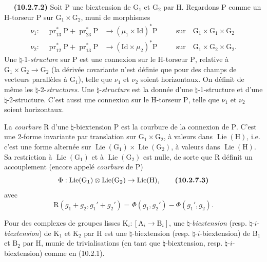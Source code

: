 \documentclass[11pt,leqno]{article}
\newcommand{\Page}[1]{\ifvmode\noindent\else\unskip\ \fi{\footnotesize\textcolor{gray}{[p.\,#1]}}\ \ignorespaces}
\begin{document}
\Page{65}
\textbf{(10.2.7.2)} Soit \(\mathrm{P}\) une biextension de
\(\mathrm{G}_1\) et \(\mathrm{G}_2\) par \(\mathrm{H}\).
Regardons \(\mathrm{P}\) comme un \(\mathrm{H}\)-torseur
\(\mathrm{P}\) sur \(\mathrm{G}_1\times\mathrm{G}_2\), muni de
morphismes
\[
\begin{aligned}
\nu_1:\quad
\operatorname{pr}_{13}^{*}\mathrm{P}
+\operatorname{pr}_{23}^{*}\mathrm{P}
&\to(\mu_1\times\mathrm{Id})^{*}\mathrm{P}
&&\quad\text{sur}\quad
\mathrm{G}_1\times\mathrm{G}_1\times\mathrm{G}_2\\
\nu_2:\quad
\operatorname{pr}_{12}^{*}\mathrm{P}
+\operatorname{pr}_{13}^{*}\mathrm{P}
&\to(\mathrm{Id}\times\mu_2)^{*}\mathrm{P}
&&\quad\text{sur}\quad
\mathrm{G}_1\times\mathrm{G}_2\times\mathrm{G}_2.
\end{aligned}
\]
Une \(\natural\)-1-\textit{structure} sur \(\mathrm{P}\) est une
connexion sur le \(\mathrm{H}\)-torseur \(\mathrm{P}\), relative à
\(\mathrm{G}_1\times\mathrm{G}_2\to\mathrm{G}_2\) (la dérivée
covariante n’est définie que pour des champs de vecteurs parallèles
à \(\mathrm{G}_1\)), telle que \(\nu_1\) et \(\nu_2\) soient
horizontaux. On définit de même les
\(\natural\)-2-\textit{structures}. Une
\(\natural\)-\textit{structure} est la donnée d’une
\(\natural\)-1-structure et d’une \(\natural\)-2-structure.
C’est aussi une connexion sur le \(\mathrm{H}\)-torseur
\(\mathrm{P}\), telle que \(\nu_1\) et \(\nu_2\) soient horizontaux.

La \textit{courbure} \(\mathrm{R}\) d’une \(\natural\)-biextension
\(\mathrm{P}\) est la courbure de la connexion de \(\mathrm{P}\).
C’est une 2-forme invariante par translation sur
\(\mathrm{G}_1\times\mathrm{G}_2\), à valeurs dans
\(\operatorname{Lie}(\mathrm{H})\), i.e. c’est une forme alternée
sur
\(\operatorname{Lie}(\mathrm{G}_1)\times
\operatorname{Lie}(\mathrm{G}_2)\), à valeurs dans
\(\operatorname{Lie}(\mathrm{H})\).
Sa restriction à \(\operatorname{Lie}(\mathrm{G}_1)\) et à
\(\operatorname{Lie}(\mathrm{G}_2)\) est nulle, de sorte que
\(\mathrm{R}\) définit un accouplement (encore appelé
\textit{courbure} de \(\mathrm{P}\))
\[
\Phi:\operatorname{Lie}(\mathrm{G}_1)\otimes
\operatorname{Lie}(\mathrm{G}_2)\to\operatorname{Lie}(\mathrm{H}),
\tag*{\textbf{(10.2.7.3)}}
\]
avec
\[
\mathrm{R}(g_1+g_2,g_1'+g_2')
=\Phi(g_1,g_2')-\Phi(g_1',g_2).
\]

Pour des complexes de groupes lisses
\(\mathrm{K}_i:[\mathrm{A}_i\to\mathrm{B}_i]\), une
\(\natural\)-\textit{biextension}
(resp. \(\natural\)-\(i\)-\textit{biextension}) de
\(\mathrm{K}_1\) et \(\mathrm{K}_2\) par \(\mathrm{H}\) est une
\(\natural\)-biextension (resp. \(\natural\)-\(i\)-biextension)
de \(\mathrm{B}_1\) et \(\mathrm{B}_2\) par \(\mathrm{H}\),
munie de trivialisations (en tant que \(\natural\)-biextension,
resp. \(\natural\)-\(i\)-biextension) comme en (10.2.1).
\end{document}
